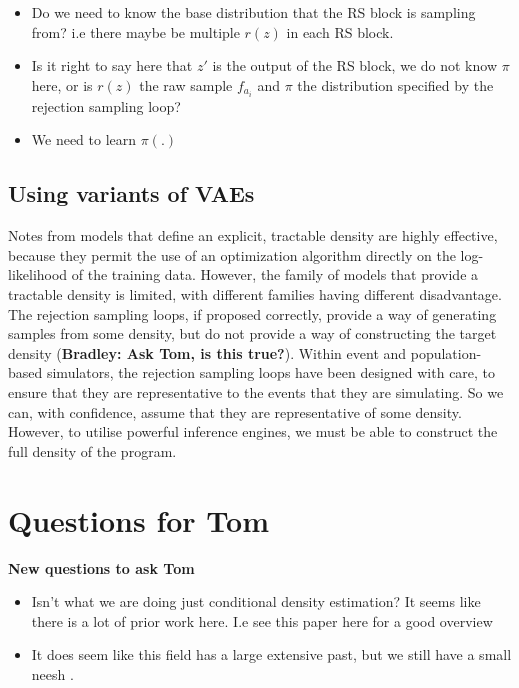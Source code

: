 \documentclass{article}
\begin{document}
\begin{itemize}
  \item Do we need to know the base distribution that the RS block is sampling from? i.e there maybe be multiple $r(z)$ in each 
  RS block. 
  \item Is it right to say here that $z\prime$ is the output of the RS block, we do not know $\pi$ here, or is $r(z)$ the raw sample $f_{a_i}$ and $\pi$ the distribution specified by the rejection sampling loop? 
  \item We need to learn $\pi(.)$
\end{itemize}
\subsection{Using variants of VAEs}

Notes from models that define an explicit,  
tractable density are highly effective, 
because they permit the use of an optimization algorithm directly on the log-likelihood of the training data.
However,  the  family  of  models  that provide  a  tractable  density  is  limited,
with  different  families  having  different disadvantage.
The rejection sampling loops, if proposed correctly, provide a way of generating 
samples from some density, but do not provide a way of constructing the target density (\textbf{Bradley: Ask Tom, is this true?}). 
Within event and population-based simulators, the rejection sampling loops have been designed with care,
to ensure that they are representative to the events that they are simulating. So we can, with confidence,
assume that they are representative of some density. 
However, to utilise powerful inference engines, we must be able to construct the 
full density of the program. 




\section{ Questions for Tom}

\textbf{New questions to ask Tom}

\begin{itemize}
  \item Isn't what we are doing just conditional density estimation? It seems
  like there is a lot of prior work here. I.e see this paper here for a good overview ~\cite{greenberg2019automatic}
  \item It does seem like this field has a large extensive past, but we still have a small neesh .
\end{itemize}
\end{document}
